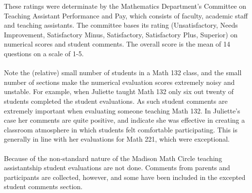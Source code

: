 \documentclass[letterpaper,11pt]{article}
\begin{document}
These ratings were determinate by the Mathematics Department's Committee on Teaching Assistant Performance and Pay, which consists of faculty, academic staff and teaching assistants. The committee bases its rating (Unsatisfactory, Needs Improvement, Satisfactory Minus, Satisfactory, Satisfactory Plus, Superior) on numerical scores and student comments. The overall score is the mean of 14 questions on a scale of 1-5.
\\
\
\\
Note the (relative) small number of students in a Math 132 class, and the small number of sections make the numerical evaluation scores extremely noisy and unstable. For example, when Juliette taught Math 132 only six out twenty of students completed the student evaluations. As such student comments are extremely important when evaluating someone teaching Math 132. In Juliette's case her comments are quite positive, and indicate she was effective in creating a classroom atmosphere in which students felt comfortable participating. This is generally in line with her evaluations for Math 221, which were exceptional.
\\
\
\\
Because of the non-standard nature of the Madison Math Circle teaching assistantship student evaluations are not done. Comments from parents and participants are collected, however, and some have been included in the excepted student comments section. 
\end{document}
